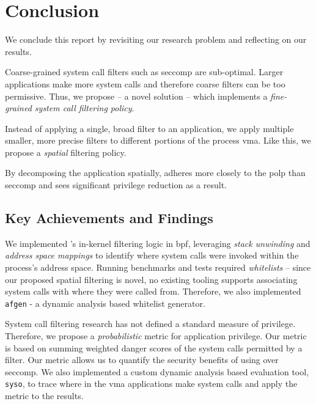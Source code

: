 \section{Conclusion}\label{sec:conclusion}


\iffalse

You need a proper conclusion chapter that will:
- recontextualise and remotivate the researhc problem tackled
- brieflly summarise your solution and its evaluation
- optionally present some of the limitations of the current prototype
- optionally include some critical reflection
- and list avenues for future works

\fi

We conclude this report by revisiting our research problem and reflecting on our
results.

Coarse-grained system call filters such as seccomp are sub-optimal.
Larger applications make more system calls and therefore coarse filters can be
too permissive. Thus, we propose \af -- a novel solution -- which implements a 
\textit{fine-grained system call filtering policy}.

Instead of applying a single, broad filter to an application, we apply multiple
smaller, more precise filters to different portions of the process \ac{vma}.
Like this, we propose a \textit{spatial} filtering policy. 

By decomposing the application spatially, \af adheres more closely to the
\ac{polp} than seccomp and sees significant privilege reduction as a result.

\subsection{Key Achievements and Findings}

We implemented \af's in-kernel filtering logic in \ac{bpf}, leveraging
\textit{stack unwinding} and \textit{address space mappings} to identify where
system calls were invoked within the process's address space. Running benchmarks
and tests required \textit{whitelists} -- since our proposed spatial filtering
is novel, no existing tooling supports associating system calls with where they
were called from. Therefore, we also implemented \texttt{afgen} - a
dynamic analysis based whitelist generator.

System call filtering research has not defined a standard measure of privilege.
Therefore, we propose a \textit{probabilistic} metric for application privilege.
Our metric is based on summing weighted danger scores of the system calls
permitted by a filter. Our metric allows us to quantify the security benefits
of using \af over seccomp. We also implemented a custom dynamic analysis based
evaluation tool, \texttt{syso}, to trace where in the \ac{vma} applications make 
system calls and apply the metric to the results.

